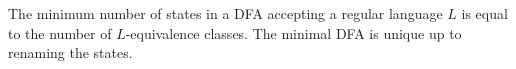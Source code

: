 

\setcounter{section}{4}
\setcounter{subsection}{3}
\setcounter{dfn}{8}

\begin{cor}
The minimum number of states in a DFA accepting a regular language $L$ is equal to the number of $L$-equivalence classes.
The minimal DFA is unique up to renaming the states.
\end{cor}

